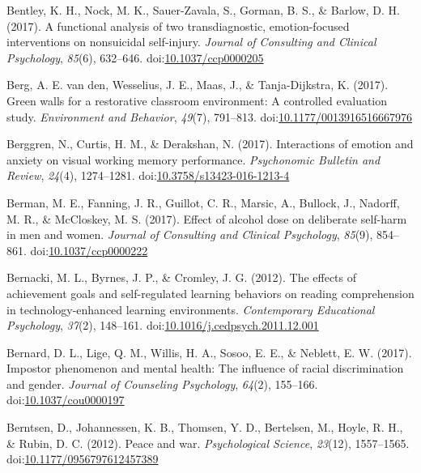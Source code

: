 \documentclass[english,man]{apa6}
\begin{document}
\hypertarget{ref-Bentley2017}{}
Bentley, K. H., Nock, M. K., Sauer-Zavala, S., Gorman, B. S., \& Barlow,
D. H. (2017). A functional analysis of two transdiagnostic,
emotion-focused interventions on nonsuicidal self-injury. \emph{Journal
of Consulting and Clinical Psychology}, \emph{85}(6), 632--646.
doi:\href{https://doi.org/10.1037/ccp0000205}{10.1037/ccp0000205}

\hypertarget{ref-VandenBerg2017}{}
Berg, A. E. van den, Wesselius, J. E., Maas, J., \& Tanja-Dijkstra, K.
(2017). Green walls for a restorative classroom environment: A
controlled evaluation study. \emph{Environment and Behavior},
\emph{49}(7), 791--813.
doi:\href{https://doi.org/10.1177/0013916516667976}{10.1177/0013916516667976}

\hypertarget{ref-Berggren2016}{}
Berggren, N., Curtis, H. M., \& Derakshan, N. (2017). Interactions of
emotion and anxiety on visual working memory performance.
\emph{Psychonomic Bulletin and Review}, \emph{24}(4), 1274--1281.
doi:\href{https://doi.org/10.3758/s13423-016-1213-4}{10.3758/s13423-016-1213-4}

\hypertarget{ref-Berman2017}{}
Berman, M. E., Fanning, J. R., Guillot, C. R., Marsic, A., Bullock, J.,
Nadorff, M. R., \& McCloskey, M. S. (2017). Effect of alcohol dose on
deliberate self-harm in men and women. \emph{Journal of Consulting and
Clinical Psychology}, \emph{85}(9), 854--861.
doi:\href{https://doi.org/10.1037/ccp0000222}{10.1037/ccp0000222}

\hypertarget{ref-Bernacki2012}{}
Bernacki, M. L., Byrnes, J. P., \& Cromley, J. G. (2012). The effects of
achievement goals and self-regulated learning behaviors on reading
comprehension in technology-enhanced learning environments.
\emph{Contemporary Educational Psychology}, \emph{37}(2), 148--161.
doi:\href{https://doi.org/10.1016/j.cedpsych.2011.12.001}{10.1016/j.cedpsych.2011.12.001}

\hypertarget{ref-Bernard2017}{}
Bernard, D. L., Lige, Q. M., Willis, H. A., Sosoo, E. E., \& Neblett, E.
W. (2017). Impostor phenomenon and mental health: The influence of
racial discrimination and gender. \emph{Journal of Counseling
Psychology}, \emph{64}(2), 155--166.
doi:\href{https://doi.org/10.1037/cou0000197}{10.1037/cou0000197}

\hypertarget{ref-Berntsen2012}{}
Berntsen, D., Johannessen, K. B., Thomsen, Y. D., Bertelsen, M., Hoyle,
R. H., \& Rubin, D. C. (2012). Peace and war. \emph{Psychological
Science}, \emph{23}(12), 1557--1565.
doi:\href{https://doi.org/10.1177/0956797612457389}{10.1177/0956797612457389}
\end{document}
